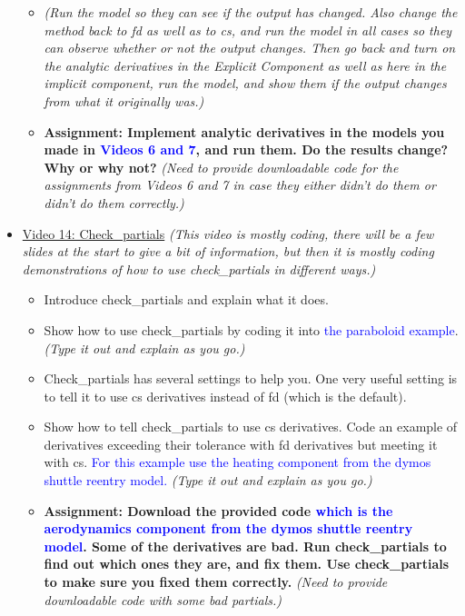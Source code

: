 \documentclass[12pt, letterpaper]{article}
\begin{document}
\begin{itemize}
\begin{itemize}
			\item \textit{(Run the model so they can see if the output has changed. Also change the method back to fd as well as to cs, and run the model in all cases so they can observe whether or not the output changes. Then go back and turn on the analytic derivatives in the Explicit Component as well as here in the implicit component, run the model, and show them if the output changes from what it originally was.)}
			\item \textbf{Assignment: Implement analytic derivatives in the models you made in \textcolor{blue}{Videos 6 and 7}, and run them. Do the results change? Why or why not?} \textit{(Need to provide downloadable code for the assignments from Videos 6 and 7 in case they either didn't do them or didn't do them correctly.)}
		\end{itemize}

	\item \underline{Video 14: Check\_partials} \textit{(This video is mostly coding, there will be a few slides at the start to give a bit of information, but then it is mostly coding demonstrations of how to use check\_partials in different ways.)}
		\begin{itemize}
			\item Introduce check\_partials and explain what it does.
			\item Show how to use check\_partials by coding it into \textcolor{blue}{the paraboloid example}. \textit{(Type it out and explain as you go.)} 
			\item Check\_partials has several settings to help you. One very useful setting is to tell it to use cs derivatives instead of fd (which is the default).
			\item Show how to tell check\_partials to use cs derivatives. Code an example of derivatives exceeding their tolerance with fd derivatives but meeting it with cs. \textcolor{blue}{For this example use the heating component from the dymos shuttle reentry model.} \textit{(Type it out and explain as you go.)} 
			\item \textbf{Assignment: Download the provided code \textcolor{blue}{which is the aerodynamics component from the dymos shuttle reentry model}. Some of the derivatives are bad. Run check\_partials to find out which ones they are, and fix them. Use check\_partials to make sure you fixed them correctly.} \textit{(Need to provide downloadable code with some bad partials.)}
		\end{itemize}


\end{itemize}
\end{document}
